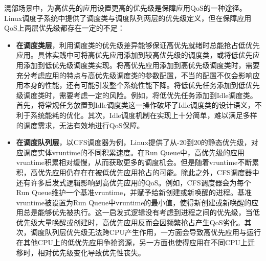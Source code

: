 
混部场景中，为高优先的应用设置更高的优先级是保障应用QoS的一种途径。Linux调度子系统中提供了调度类与调度队列两层的优先级定义，但在保障应用QoS上两层优先级都存在一定的不足：

\begin{itemize}

    \item \textbf{在调度类层}，利用调度类的优先级差异能够保证高优先就绪时总能抢占低优先应用。具体实践中可将高优先应用添加到较高优先级的调度类，或将低优先应用添加到低优先级调度类实现。将高优先应用添加到高优先级调度类时，需要充分考虑应用的特点与高优先级调度类的参数配置，不当的配置不仅会影响应用本身的性能，还有可能引发整个系统性能下降。将低优先任务添加到低优先级调度类时，需要考虑一定的风险。例如，将低优先任务添加到Idle调度类。首先，将常规任务放置到Idle调度类这一操作破坏了Idle调度类的设计语义，不利于系统能耗的优化。其次，Idle调度机制在实现上十分简单，难以满足多样的调度需求，无法有效地进行QoS保障。

    \item \textbf{在调度队列层}，以CFS调度器为例，Linux提供了从-20到20的静态优先级，对应调度实体vruntime的不同积累速度。在Run Queue中，高优先级的应用vruntime积累相对缓慢，从而获取更多的调度机会。但是随着vruntime不断累积，高优先应用仍存在在被低优先应用抢占的可能。除此之外，CFS调度器中还有许多启发式逻辑影响到高优先应用的QoS。例如，CFS调度器会为每个Run Queue维护一个基准vruntime，并赋予给新创建或新唤醒的进程。基准vruntime被设置为Run Queue中vruntime的最小值，使得新创建或新唤醒的应用总是能够优先被执行。这一启发式逻辑没有考虑到进程之间的优先级，当低优先级大量唤醒或创建时，高优先应用反而会因频繁抢占产生QoS劣化。其次，调度队列层优先级无法跨CPU产生作用，一方面会导致高优先应用与运行在其他CPU上的低优先应用争抢资源，另一方面也使得应用在不同CPU上迁移时，相对优先级变化导致优先性丧失。

\end{itemize}

